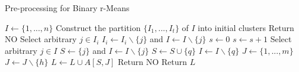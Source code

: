 \begin{algorithm}[H]
    \caption{Pre-processing for Binary r-Means}
    \label{alg:kernel}
    \begin{algorithmic}[1]
            \State $I \gets \{1,...,n\}$
            \State Construct the partition $\{I_1,...,I_t\}$ of $I$ into initial clusters
                \State Return NO
            \Else
                    
                        \State Select arbitrary $j \in I_i$
                        \State $I_i \gets I_i \backslash \{j\}$ and $I \gets I \backslash \{j\}$
                    \EndWhile
                \EndFor
                \State $s \gets 0$
                 
                    \State $s \gets s+1$
                    \State Select arbitrary $j \in I$
                    \State $S \gets \{j\}$ and $I \gets I \backslash \{j\}$
                        \State $S \gets S \cup \{q\}$
                        \State $I \gets I \backslash \{q\}$
                    \EndWhile
                    \State $J \gets \{1,...,m\}$
                        \State $J \gets J \backslash \{h\}$ 
                    \EndWhile
                    \State $L \gets L \cup A[S,J]$
                \EndWhile
            \EndIf
                \State Return NO
            \Else
                \State Return $L$
            \EndIf
        \EndProcedure
    \end{algorithmic}
\end{algorithm}